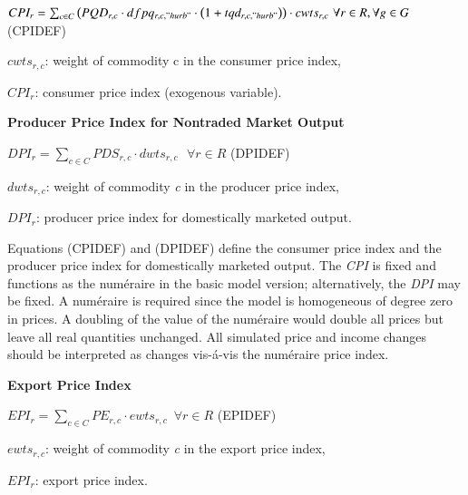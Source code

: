 \documentclass[10pt,a4paper,titlepage,dvipdfmx]{book}
\begin{document}
\begin{center}$CPI_{r}=\sum _{c\in C}\left(PQD_{r,c}\cdot dfpq_{r,c,"hurb"}\cdot \left(1+tqd_{r,c,"hurb"}\right)\right)\cdot cwts_{r,c}\,\,\forall r\in R,\forall g\in G$ (CPIDEF)
\end{center}

\begin{flushleft}
$cwts_{r,c}$: weight of commodity c in the consumer price index,

$CPI_{r}$: consumer price index (exogenous variable).
\end{flushleft}

\begin{flushleft}\textbf{Producer Price Index for Nontraded Market Output}\end{flushleft}


\begin{center}$DPI_{r}=\sum _{c\in C}PDS_{r,c}\cdot dwts_{r,c}\,\,\,\,\forall r\in R$ (DPIDEF)
\end{center}

\begin{flushleft}
$dwts_{r,c}$: weight of commodity \textit{c} in the producer price index,

$DPI_{r}$: producer price index for domestically marketed output.
\end{flushleft}

Equations (CPIDEF) and (DPIDEF) define the consumer price index and the producer price index for domestically marketed output. The \textit{CPI} is fixed and functions as the num\'{e}raire in the basic model version; alternatively, the \textit{DPI} may be fixed. A num\'{e}raire is required since the model is homogeneous of degree zero in prices. A doubling of the value of the num\'{e}raire would double all prices but leave all real quantities unchanged. All simulated price and income changes should be interpreted as changes vis-\'{a}-vis the num\'{e}raire price index.

\begin{flushleft}\textbf{Export Price Index}\end{flushleft}


\begin{center}$EPI_{r}=\sum _{c\in C}PE_{r,c}\cdot ewts_{r,c}\,\,\,\forall r\in R$ (EPIDEF)
\end{center}

\begin{flushleft}
$ewts_{r,c}$: weight of commodity \textit{c} in the export price index,

$EPI_{r}$: export price index.
\end{flushleft}
\end{document}
